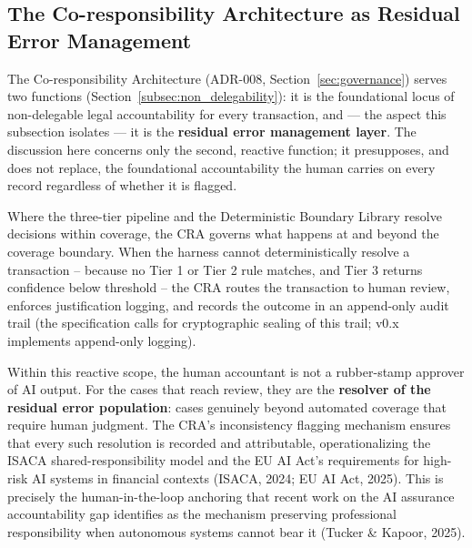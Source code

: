 \subsection{The Co-responsibility Architecture as Residual Error
Management}
\label{subsec:cra_as_error_management}

The Co-responsibility Architecture (ADR-008, Section~\ref{sec:governance}) serves two functions
(Section~\ref{subsec:non_delegability}): it is the foundational locus of
non-delegable legal accountability for every transaction, and --- the aspect
this subsection isolates --- it is the \textbf{residual error management
layer}. The discussion here concerns only the second, reactive function; it
presupposes, and does not replace, the foundational accountability the human
carries on every record regardless of whether it is flagged.

Where the three-tier pipeline and the Deterministic Boundary Library resolve
decisions within coverage, the CRA governs what happens at and beyond the
coverage boundary. When the harness cannot deterministically resolve a
transaction -- because no Tier 1 or Tier 2 rule matches, and Tier 3 returns
confidence below threshold -- the CRA routes the transaction to human review,
enforces justification logging, and records the outcome in an append-only
audit trail (the specification calls for cryptographic sealing of this
trail; v0.x implements append-only logging).

Within this reactive scope, the human accountant is not a rubber-stamp
approver of AI output. For the cases that reach review, they are the
\textbf{resolver of the residual error population}: cases genuinely beyond
automated coverage that require human judgment. The CRA's inconsistency
flagging mechanism ensures that every such resolution is recorded and
attributable, operationalizing the ISACA shared-responsibility model and the
EU AI Act's requirements for high-risk AI systems in financial contexts
(ISACA, 2024; EU AI Act, 2025). This is precisely the human-in-the-loop
anchoring that recent work on the AI assurance accountability gap identifies
as the mechanism preserving professional responsibility when autonomous
systems cannot bear it (Tucker \& Kapoor, 2025).

